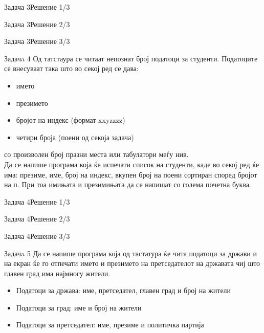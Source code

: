 \begin{frame}[fragile]{Задача 3}{Решение 1/3}

\end{frame}

\begin{frame}[fragile]{Задача 3}{Решение 2/3}

\end{frame}

\begin{frame}[fragile]{Задача 3}{Решение 3/3}

\end{frame}

\begin{frame}{Задачa 4}
Од татстаура се читаат непознат број податоци за студенти. Податоците се
внесуваат така што во секој ред се дава:
\begin{itemize}
  \item името
  \item презимето
  \item бројот на индекс (формат xxyzzzz)
  \item четири броја (поени од секоја задача)
\end{itemize}         
     со произволен број празни места или табулатори меѓу нив.\\
Да се напише програма која ќе испечати список на студенти, каде во секој ред ќе
има: презиме, име, број на индекс, вкупен број на поени сортиран според бројот
на п. При тоа имињата и презимињата да се напишат со голема почетна буква.
\end{frame}

\begin{frame}[fragile]{Задача 4}{Решение 1/3}

\end{frame}

\begin{frame}[fragile]{Задача 4}{Решение 2/3}

\end{frame}

\begin{frame}[fragile]{Задача 4}{Решение 3/3}

\end{frame}


\begin{frame}{Задачa 5}
Да се напише програма која од тастатура ќе чита податоци за држави и на екран ќе
го отпечати името и презимето на претседателот на државата чиј што главен град
има најмногу жители.
\begin{itemize}
  \item Податоци за држава: име, претседател, главен град и број на жители
  \item Податоци за град: име и број на жители
  \item Податоци за претседател: име, презиме и политичка партија
\end{itemize}
\end{frame}

